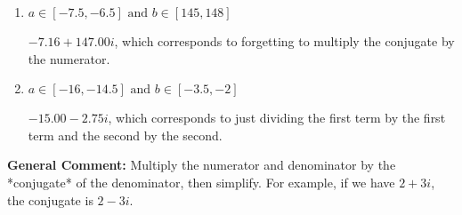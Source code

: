 \documentclass{extbook}[14pt]
\begin{document}
\begin{enumerate}
{\begin{enumerate}[label=\Alph*.]
 $-3.64  - 8.52 i$, which corresponds to forgetting to multiply the conjugate by the numerator and not computing the conjugate correctly.
\item \( a \in [-7.5, -6.5] \text{ and } b \in [145, 148] \)

 $-7.16  + 147.00 i$, which corresponds to forgetting to multiply the conjugate by the numerator.
\item \( a \in [-16, -14.5] \text{ and } b \in [-3.5, -2] \)

 $-15.00  - 2.75 i$, which corresponds to just dividing the first term by the first term and the second by the second.
\end{enumerate}

\textbf{General Comment:} Multiply the numerator and denominator by the *conjugate* of the denominator, then simplify. For example, if we have $2+3i$, the conjugate is $2-3i$.
}
\end{enumerate}
\end{document}
